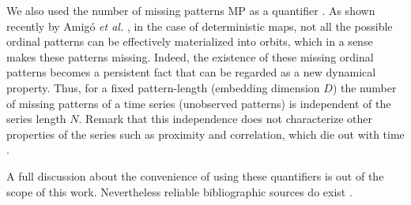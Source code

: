 We also used the number of missing patterns MP as a quantifier \cite{Rosso2012}.
As shown recently by Amig\'o {\it et al.} \cite{Amigo2006,Amigo2007,Amigo2008,Amigo2010}, in the case of deterministic maps, not all the possible ordinal patterns can be effectively materialized into orbits, which in a sense makes these patterns missing.
Indeed, the existence of these missing ordinal patterns becomes a persistent fact that can be regarded as a new dynamical property.
Thus, for a fixed pattern-length (embedding dimension $D$) the number of missing patterns of a time series (unobserved patterns) is independent of the series length $N$.
Remark that this independence does not characterize other properties of the series such as proximity and correlation, which die out with time \cite{Amigo2007,Amigo2010}.

A full discussion about the convenience of using these quantifiers is out of the scope of this work.
Nevertheless reliable bibliographic sources do exist \cite{DeMicco2008,Rosso2010,Rosso2012,Lopez-Ruiz1995,Martin2006,Wackerbauer1994,Rosso2007A}.


